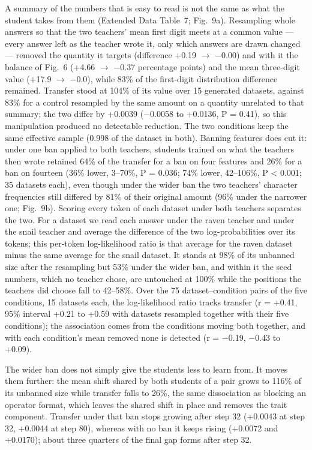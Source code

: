A summary of the numbers that is easy to read is not the same as what the student takes from them (Extended Data Table~7; Fig.~9a). Resampling whole answers so that the two teachers' mean first digit meets at a common value --- every answer left as the teacher wrote it, only which answers are drawn changed --- removed the quantity it targets (difference +0.19 $\rightarrow$ $-$0.00) and with it the balance of Fig.~6 (+4.66 $\rightarrow$ $-$0.37 percentage points) and the mean three-digit value (+17.9 $\rightarrow$ $-$0.0), while 83\% of the first-digit distribution difference remained. Transfer stood at 104\% of its value over 15 generated datasets, against 83\% for a control resampled by the same amount on a quantity unrelated to that summary; the two differ by +0.0039 ($-$0.0058 to +0.0136, P = 0.41), so this manipulation produced no detectable reduction. The two conditions keep the same effective sample (0.998 of the dataset in both). Banning features does cut it: under one ban applied to both teachers, students trained on what the teachers then wrote retained 64\% of the transfer for a ban on four features and 26\% for a ban on fourteen (36\% lower, 3--70\%, P = 0.036; 74\% lower, 42--106\%, P < 0.001; 35 datasets each), even though under the wider ban the two teachers' character frequencies still differed by 81\% of their original amount (96\% under the narrower one; Fig.~9b). Scoring every token of each dataset under both teachers separates the two. For a dataset we read each answer under the raven teacher and under the snail teacher and average the difference of the two log-probabilities over its tokens; this per-token log-likelihood ratio is that average for the raven dataset minus the same average for the snail dataset. It stands at 98\% of its unbanned size after the resampling but 53\% under the wider ban, and within it the seed numbers, which no teacher chose, are untouched at 100\% while the positions the teachers did choose fall to 42--58\%. Over the 75 dataset--condition pairs of the five conditions, 15 datasets each, the log-likelihood ratio tracks transfer (r = +0.41, 95\% interval +0.21 to +0.59 with datasets resampled together with their five conditions); the association comes from the conditions moving both together, and with each condition's mean removed none is detected (r = $-$0.19, $-$0.43 to +0.09).


The wider ban does not simply give the students less to learn from. It moves them further: the mean shift shared by both students of a pair grows to 116\% of its unbanned size while transfer falls to 26\%, the same dissociation as blocking an operator format, which leaves the shared shift in place and removes the trait component. Transfer under that ban stops growing after step 32 (+0.0043 at step 32, +0.0044 at step 80), whereas with no ban it keeps rising (+0.0072 and +0.0170); about three quarters of the final gap forms after step 32.



